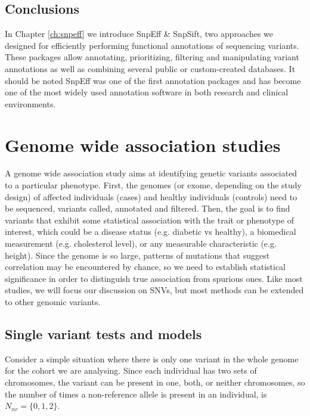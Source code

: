 \subsection{Conclusions}

In Chapter \ref{ch:snpeff} we introduce SnpEff \& SnpSift, two approaches we designed for efficiently performing functional annotations of sequencing variants. These packages allow annotating, prioritizing, filtering and manipulating variant annotations as well as combining several public or custom-created databases. It should be noted SnpEff was one of the first annotation packages and has become one of the most widely used annotation software in both research and clinical environments. 

\section{Genome wide association studies}

A genome wide association study aims at identifying genetic variants associated to a particular phenotype. First, the genomes (or exome, depending on the study design) of affected individuals (cases) and healthy individuals (controls) need to be sequenced, variants called, annotated and filtered. Then, the goal is to find variants that exhibit some statistical association with the trait or phenotype of interest, which could be a disease status (e.g. diabetic vs healthy), a biomedical measurement (e.g. cholesterol level), or any measurable characteristic (e.g. height). Since the genome is so large, patterns of mutations that suggest correlation may be encountered by chance, so we need to establish statistical significance in order to distinguish true association from spurious ones. Like most studies, we will focus our discussion on SNVs, but most methods can be extended to other genomic variants.

\subsection{Single variant tests and models \label{sec:single}}

Consider a simple situation where there is only one variant in the whole genome for the cohort we are analysing. Since each individual has two sets of chromosomes, the variant can be present in one, both, or neither chromosomes, so the number of times a non-reference allele is present in an individual, is $ N_{nr} = \{0, 1,2\}$.

